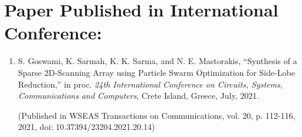 \section*{Paper Published in International Conference:}
\begin{enumerate}
\item S. Goswami, K. Sarmah, K. K. Sarma, and N. E. Mastorakis, ``Synthesis of a Sparse 2D-Scanning Array using Particle Swarm Optimization for Side-Lobe Reduction,'' in proc. \emph{24th International Conference on Circuits, Systems, Communications and Computers}, Crete Island, Greece, July, 2021.

    (Published in WSEAS Transactions on Communications, vol. 20, p. 112-116, 2021, doi: 10.37394/23204.2021.20.14)
\end{enumerate} 